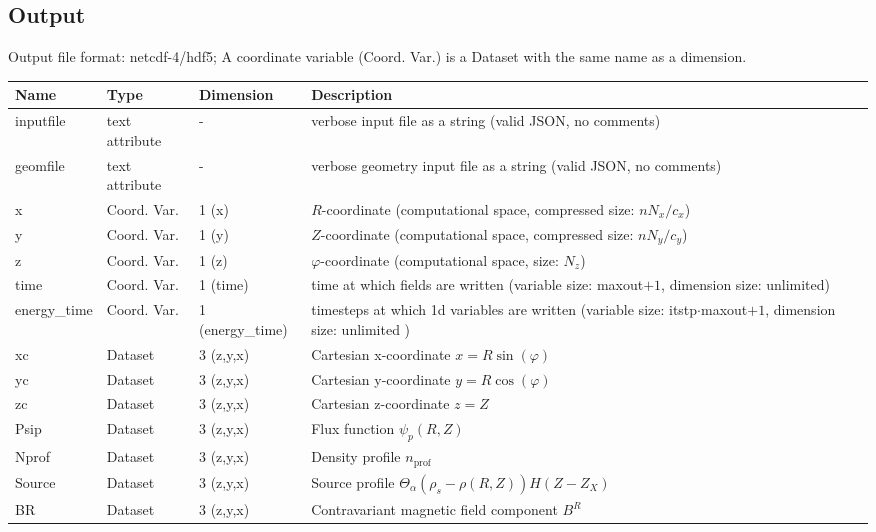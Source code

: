 \subsection{Output} \label{sec:output_file}
Output file format: netcdf-4/hdf5; A coordinate variable (Coord. Var.) is a Dataset with the same name as a dimension.
%
\begin{longtable}{lll>{\RaggedRight}p{7cm}}
\toprule
\rowcolor{gray!50}\textbf{Name} &  \textbf{Type} & \textbf{Dimension} & \textbf{Description}  \\ \midrule
inputfile  &     text attribute & - & verbose input file as a string (valid JSON, no comments) \\
geomfile   &     text attribute & - & verbose geometry input file as a string (valid JSON, no comments) \\
x                & Coord. Var. & 1 (x) & $R$-coordinate (computational space, compressed size: $nN_x/c_x$)\\
y                & Coord. Var. & 1 (y) & $Z$-coordinate (computational space, compressed size: $nN_y/c_y$)\\
z                & Coord. Var. & 1 (z) & $\varphi$-coordinate (computational space, size: $N_z$) \\
time             & Coord. Var. & 1 (time)& time at which fields are written (variable size: maxout$+1$, dimension size: unlimited) \\
energy\_time     & Coord. Var. & 1 (energy\_time) & timesteps at which 1d variables are written (variable size: itstp$\cdot$maxout$+1$, dimension size: unlimited ) \\
xc           & Dataset & 3 (z,y,x) & Cartesian x-coordinate $x=R\sin(\varphi)$ \\
yc           & Dataset & 3 (z,y,x) & Cartesian y-coordinate $y=R\cos(\varphi)$\\
zc           & Dataset & 3 (z,y,x) & Cartesian z-coordinate $z=Z$ \\
Psip             & Dataset & 3 (z,y,x) & Flux function $\psi_p(R,Z)$ \\
Nprof            & Dataset & 3 (z,y,x) & Density profile $n_\text{prof}$ \\
Source           & Dataset & 3 (z,y,x) & Source  profile $\Theta_\alpha(\rho_{s} - \rho(R,Z)) H(Z-Z_X)$\\
BR               & Dataset & 3 (z,y,x) & Contravariant magnetic field component $B^R$ \\

\end{longtable}
